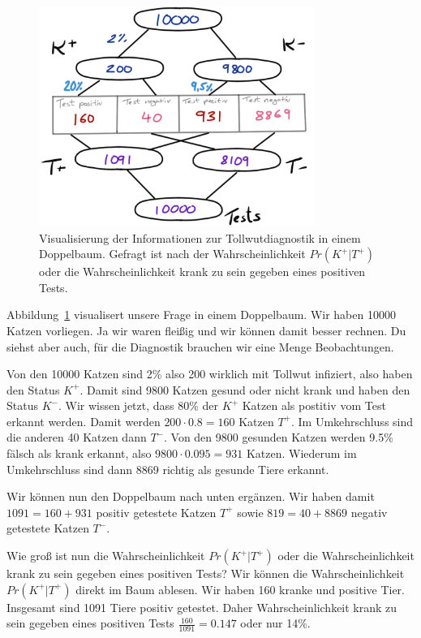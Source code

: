 \documentclass[
  letterpaper,
]{scrbook}
\begin{document}
\begin{figure}

{\centering \includegraphics[width=0.8\textwidth,height=\textheight]{./images/diag_testen_doppel.png}

}

\caption{\label{fig-stat-diag-01}Visualisierung der Informationen zur
Tollwutdiagnostik in einem Doppelbaum. Gefragt ist nach der
Wahrscheinlichkeit \(Pr(K^+|T^+)\) oder die Wahrscheinlichkeit krank zu
sein gegeben eines positiven Tests.}

\end{figure}

Abbildung~\ref{fig-stat-diag-01} visualisert unsere Frage in einem
Doppelbaum. Wir haben 10000 Katzen vorliegen. Ja wir waren fleißig und
wir können damit besser rechnen. Du siehst aber auch, für die Diagnostik
brauchen wir eine Menge Beobachtungen.

Von den 10000 Katzen sind 2\% also 200 wirklich mit Tollwut infiziert,
also haben den Status \(K^+\). Damit sind 9800 Katzen gesund oder nicht
krank und haben den Status \(K^-\). Wir wissen jetzt, dass 80\% der
\(K^+\) Katzen als postitiv vom Test erkannt werden. Damit werden
\(200 \cdot 0.8 = 160\) Katzen \(T^+\). Im Umkehrschluss sind die
anderen 40 Katzen dann \(T^-\). Von den 9800 gesunden Katzen werden
9.5\% fälsch als krank erkannt, also \(9800 \cdot 0.095 = 931\) Katzen.
Wiederum im Umkehrschluss sind dann 8869 richtig als gesunde Tiere
erkannt.

Wir können nun den Doppelbaum nach unten ergänzen. Wir haben damit
\(1091 = 160 + 931\) positiv getestete Katzen \(T^+\) sowie
\(819 = 40 + 8869\) negativ getestete Katzen \(T^-\).

Wie groß ist nun die Wahrscheinlichkeit \(Pr(K^+|T^+)\) oder die
Wahrscheinlichkeit krank zu sein gegeben eines positiven Tests? Wir
können die Wahrscheinlichkeit \(Pr(K^+|T^+)\) direkt im Baum ablesen.
Wir haben 160 kranke und positive Tier. Insgesamt sind 1091 Tiere
positiv getestet. Daher Wahrscheinlichkeit krank zu sein gegeben eines
positiven Tests \(\tfrac{160}{1091} = 0.147\) oder nur 14\%.
\end{document}

